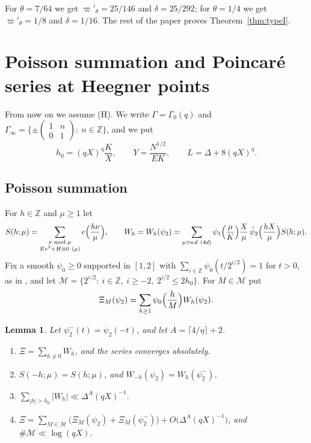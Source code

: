 \documentclass[11pt]{amsart}
\newtheorem{lemma}[theorem]{Lemma}
\theoremstyle{remark}
\theoremstyle{definition}
\numberwithin{equation}{section}
\newcommand{\Mset}{\mathcal{M}}
\newcommand{\Z}{\mathbb{Z}}
\begin{document}
For $\theta=7/64$ we get $\varpi'_\theta=25/146$ and $\delta=25/292$; for $\theta=1/4$ we get $\varpi'_\theta=1/8$ and $\delta=1/16$. The rest of the paper proves Theorem~\ref{thm:typeI}.

\section{Poisson summation and Poincar\'e series at Heegner points}\label{sec:poisson}

From now on we assume (H). We write $\Gamma=\Gamma_0(q)$ and $\Gamma_\infty=\{\pm\left(\begin{smallmatrix}1&n\\0&1\end{smallmatrix}\right):\ n\in\Z\}$, and we put
\begin{equation}\label{eq:params}
h_0=(qX)^\eta\frac KX,\qquad Y=\frac{N^{1/2}}{EK},\qquad L=\Delta+8(qX)^\eta.
\end{equation}

\subsection{Poisson summation}
For $h\in\Z$ and $\mu\ge1$ let
\[
S(h;\mu)=\sum_{\substack{\nu\bmod\mu\\ E\nu^2+H\equiv0\ (\mu)}}e\Bigl(\frac{h\nu}\mu\Bigr),\qquad W_h=W_h(\psi_2)=\sum_{\mu\equiv\kappa d\ (4d)}\psi_1\Bigl(\frac\mu K\Bigr)\frac X\mu\,\hat\psi_2\Bigl(\frac{hX}\mu\Bigr)S(h;\mu).
\]
Fix a smooth $\psi_0\ge0$ supported in $[1,2]$ with $\sum_{i\in\Z}\psi_0(t/2^{i/2})=1$ for $t>0$, as in \cite[\S7.3]{II}, and let $\Mset=\{2^{i/2}:\ i\in\Z,\ i\ge-2,\ 2^{i/2}\le2h_0\}$. For $M\in\Mset$ put
\[
\Xi_M(\psi_2)=\sum_{h\ge1}\psi_0\Bigl(\frac hM\Bigr)W_h(\psi_2).
\]

\begin{lemma}\label{lem:poisson}
Let $\psi_2^-(t)=\psi_2(-t)$, and let $A=\lceil4/\eta\rceil+2$.
\begin{enumerate}
\item[(a)] $\Xi=\sum_{h\ne0}W_h$, and the series converges absolutely.
\item[(b)] $S(-h;\mu)=S(h;\mu)$, and $W_{-h}(\psi_2)=W_h(\psi_2^-)$.
\item[(c)] $\sum_{|h|>h_0}|W_h|\ll\Delta^{A}(qX)^{-1}$.
\item[(d)] $\Xi=\sum_{M\in\Mset}\bigl(\Xi_M(\psi_2)+\Xi_M(\psi_2^-)\bigr)+O\bigl(\Delta^A(qX)^{-1}\bigr)$, and $\#\Mset\ll\log(qX)$.
\end{enumerate}
\end{lemma}
\end{document}
